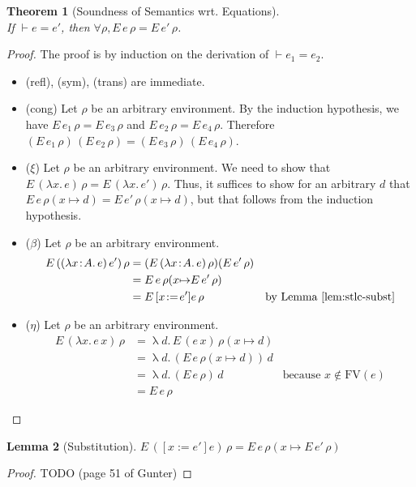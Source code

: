 \documentclass{tufte-handout}
\newcommand{\LAM}[1]{\lambda #1.\,}
\newcommand{\APP}[0]{\,}
\newcommand{\of}[0]{\!:\!}
\newcommand{\by}[0]{\!:=\!}
\newcommand{\ext}[3]{#3(#1{\mapsto}#2)}
\newtheorem{theorem}{Theorem}%
\newtheorem{lemma}[theorem]{Lemma}
\begin{document}
\begin{theorem}[Soundness of Semantics wrt. Equations]\ \\
  \noindent
  If $\vdash e = e'$, then $\forall \rho, E\,e\,\rho = E\,e'\,\rho$.
\end{theorem}
\begin{proof}
  The proof is by induction on the derivation of $\vdash e_1 = e_2$.
  \begin{itemize}
  \item (refl), (sym), (trans) are immediate.
  \item (cong)
    Let $\rho$ be an arbitrary environment.
    By the induction hypothesis, we have $E\,e_1\,\rho = E\,e_3\,\rho$
    and $E\,e_2\,\rho = E\,e_4\,\rho$. Therefore
    $(E\,e_1\,\rho)\APP(E\,e_2\,\rho) = (E\,e_3\,\rho) \APP (E\,e_4\,\rho)$.
    
  \item ($\xi$) Let $\rho$ be an arbitrary environment.  We need to
    show that $E\,(\LAM{x}e)\,\rho = E\,(\LAM{x}e')\,\rho$. Thus, it
    suffices to show for an arbitrary $d$ that
    $E\, e\, \ext{x}{d}{\rho} = E\, e'\, \ext{x}{d}{\rho}$,
    but that follows from the induction hypothesis.
    
  \item ($\beta$) Let $\rho$ be an arbitrary environment.
    \begin{align*}
      E\,((\LAM{x\of A}e)\APP e')\,\rho &=
      (E\,(\LAM{x\of A}e)\,\rho) (E\,e'\,\rho) \\
      &= E\,e\,\ext{x}{E\,e'\,\rho}{\rho} \\
      &= E\,[x\by e']e\,\rho  & \text{by Lemma~\ref{lem:stlc-subst}}
    \end{align*}
    
  \item ($\eta$) Let $\rho$ be an arbitrary environment.
    \begin{align*}
      E\,(\LAM{x} e \APP x)\,\rho &=
      \uplambda d.\,E\,(e \APP x)\,\ext{x}{d}{\rho} \\
      &= \uplambda d.\,(E\,e\,\ext{x}{d}{\rho}) \APP d \\
      &= \uplambda d.\,(E\,e\,\rho) \APP d & \text{because } x \notin \mathrm{FV}(e)\\
      &= E\,e\,\rho
    \end{align*}
    
  \end{itemize}
\end{proof}

\begin{lemma}[Substitution]
  \label{lem:stlc-subst}
  $E\,([x\by e']e)\,\rho = E\,e\,\ext{x}{E\,e'\,\rho}{\rho}$
\end{lemma}
\begin{proof}
  TODO (page 51 of Gunter)
\end{proof}
\end{document}

